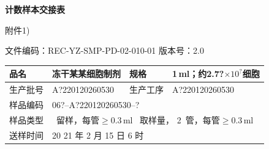 \documentclass[UTF8,10pt,a4paper,fontset=fandol]{ctexart}
\newcommand{\fieldvalue}[1]{#1}
\newcommand{\handwritten}[1]{#1}
\begin{document}
\begin{center}
    {\large\bfseries 计数样本交接表}
\end{center}

\handwritten{附件1)}

\noindent
文件编码：REC-YZ-SMP-PD-02-010-01 \qquad 版本号：2.0

\begin{tabularx}{\textwidth}{|p{3.1cm}|X|p{3.1cm}|X|}
\hline
品名 &
\fieldvalue{\handwritten{冻干某某细胞制剂}} &
规格 &
\fieldvalue{\handwritten{1\,ml；约2.7?$\times10^{?}$细胞}}\\
\hline
生产批号 &
\fieldvalue{\handwritten{A?220120260530}} &
生产工序 &
\fieldvalue{\handwritten{A?220120260530}}\\
\hline
\multicolumn{1}{|c|}{样品编码} &
\multicolumn{3}{l|}{
\fieldvalue{\handwritten{06?--A?220120260530--?}}
}\\
\hline
\multicolumn{1}{|c|}{样品类型} &
\multicolumn{3}{l|}{
\fieldvalue{\checkmark}\ 留样，每管$\geq 0.3$\,ml
\qquad
\fieldvalue{\checkmark}\ 取样量，
\fieldvalue{\handwritten{2}}\ 管，每管$\geq 0.3$\,ml
}\\
\hline
\multicolumn{1}{|c|}{送样时间} &
\multicolumn{3}{l|}{
20
\fieldvalue{\handwritten{21}} 年
\fieldvalue{\handwritten{2}} 月
\fieldvalue{\handwritten{15}} 日
\fieldvalue{\handwritten{6}} 时
}
\end{tabularx}
\end{document}

